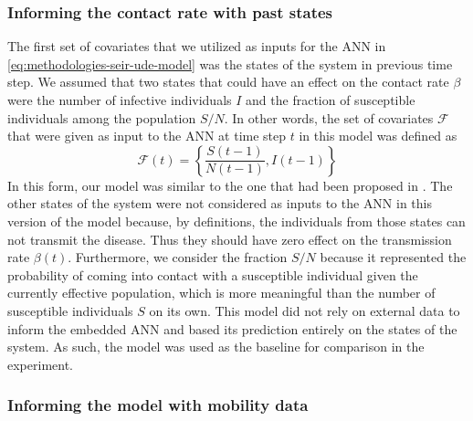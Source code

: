 \subsubsection{Informing the contact rate with past states}
The first set of covariates that we utilized as inputs for the \gls{ANN} in \autoref{eq:methodologies-seir-ude-model} was the states of the system in previous time step.
We assumed that two states that could have an effect on the contact rate $\beta$ were the number of infective individuals $I$ and the fraction of susceptible individuals among the population $S/N$.
In other words, the set of covariates $\mathcal{F}$ that were given as input to the \gls{ANN} at time step $t$ in this model was defined as
\begin{equation*}
    \mathcal{F}(t) = \left\lbrace \frac{S(t-1)}{N(t-1)}, I(t-1) \right\rbrace
\end{equation*}
In this form, our model was similar to the one that had been proposed in \cite{dandekarMachineLearningAidedGlobal2020a}.
The other states of the system were not considered as inputs to the \gls{ANN} in this version of the model because, by definitions, the individuals from those states can not transmit the disease.
Thus they should have zero effect on the transmission rate $\beta(t)$.
Furthermore, we consider the fraction $S/N$ because it represented the probability of coming into contact with a susceptible individual given the currently effective population, which is more meaningful than the number of susceptible individuals $S$ on its own.
This model did not rely on external data to inform the embedded \gls{ANN} and based its prediction entirely on the states of the system.
As such, the model was used as the baseline for comparison in the experiment.

\subsubsection{Informing the model with mobility data}

